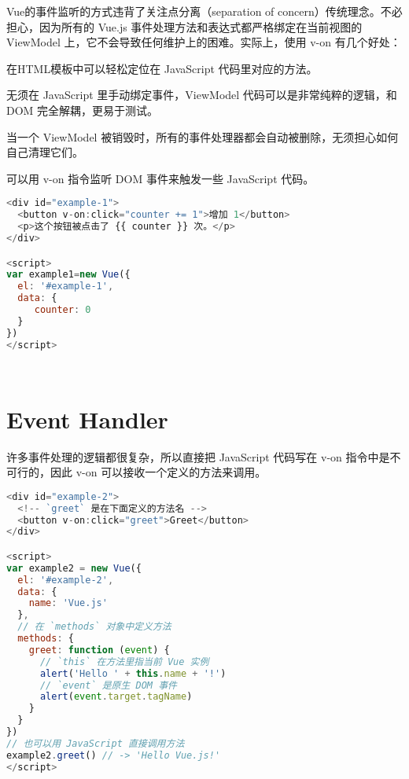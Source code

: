 Vue的事件监听的方式违背了关注点分离（separation of concern）传统理念。不必担心，因为所有的 Vue.js 事件处理方法和表达式都严格绑定在当前视图的 ViewModel 上，它不会导致任何维护上的困难。实际上，使用 v-on 有几个好处：

\begin{compactitem}
\item 在HTML模板中可以轻松定位在 JavaScript 代码里对应的方法。

\item 无须在 JavaScript 里手动绑定事件，ViewModel 代码可以是非常纯粹的逻辑，和 DOM 完全解耦，更易于测试。
\item 当一个 ViewModel 被销毁时，所有的事件处理器都会自动被删除，无须担心如何自己清理它们。
\end{compactitem}

可以用 v-on 指令监听 DOM 事件来触发一些 JavaScript 代码。


\begin{lstlisting}[language=JavaScript]
<div id="example-1">
  <button v-on:click="counter += 1">增加 1</button>
  <p>这个按钮被点击了 {{ counter }} 次。</p>
</div>

<script>
var example1=new Vue({
  el: '#example-1',
  data: {
     counter: 0
  }
})
</script>
\end{lstlisting}



\begin{lstlisting}[language=JavaScript]

\end{lstlisting}



\begin{lstlisting}[language=JavaScript]

\end{lstlisting}

\section{Event Handler}

许多事件处理的逻辑都很复杂，所以直接把 JavaScript 代码写在 v-on 指令中是不可行的，因此 v-on 可以接收一个定义的方法来调用。

\begin{lstlisting}[language=JavaScript]
<div id="example-2">
  <!-- `greet` 是在下面定义的方法名 -->
  <button v-on:click="greet">Greet</button>
</div>

<script>
var example2 = new Vue({
  el: '#example-2',
  data: {
    name: 'Vue.js'
  },
  // 在 `methods` 对象中定义方法
  methods: {
    greet: function (event) {
      // `this` 在方法里指当前 Vue 实例
      alert('Hello ' + this.name + '!')
      // `event` 是原生 DOM 事件
      alert(event.target.tagName)
    }
  }
})
// 也可以用 JavaScript 直接调用方法
example2.greet() // -> 'Hello Vue.js!'
</script>
\end{lstlisting}



